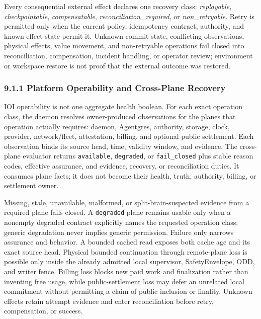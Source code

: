 \documentclass[
  11pt,
]{article}
\begin{document}
Every consequential external effect declares one recovery class:
\emph{replayable}, \emph{checkpointable}, \emph{compensatable},
\emph{reconciliation\_required}, or \emph{non\_retryable}. Retry is permitted
only when the current policy, idempotency contract, authority, and known
effect state permit it. Unknown commit state, conflicting observations,
physical effects, value movement, and non-retryable operations fail closed
into reconciliation, compensation, incident handling, or operator review;
environment or workspace restore is not proof that the external outcome was
restored.

\hypertarget{platform-operability-and-cross-plane-recovery}{%
\subsubsection{9.1.1 Platform Operability and Cross-Plane
Recovery}\label{platform-operability-and-cross-plane-recovery}}

IOI operability is not one aggregate health boolean. For each exact operation
class, the daemon resolves owner-produced observations for the planes that
operation actually requires: daemon, Agentgres, authority, storage, clock,
provider, network/fleet, attestation, billing, and optional public settlement.
Each observation binds its source head, time, validity window, and evidence.
The cross-plane evaluator returns \texttt{available}, \texttt{degraded}, or
\texttt{fail\_closed} plus stable reason codes, effective assurance, and
evidence, recovery, or reconciliation duties. It consumes plane facts; it does
not become their health, truth, authority, billing, or settlement owner.

Missing, stale, unavailable, malformed, or split-brain-suspected evidence from
a required plane fails closed. A \texttt{degraded} plane remains usable only
when a nonempty degraded contract explicitly names the requested operation
class; generic degradation never implies generic permission. Failure only
narrows assurance and behavior. A bounded cached read exposes both cache age
and its exact source head. Physical bounded continuation through remote-plane
loss is possible only inside the already admitted local supervisor,
SafetyEnvelope, ODD, and writer fence. Billing loss blocks new paid work and
finalization rather than inventing free usage, while public-settlement loss may
defer an unrelated local commitment without permitting a claim of public
inclusion or finality. Unknown effects retain attempt evidence and enter
reconciliation before retry, compensation, or success.
\end{document}
